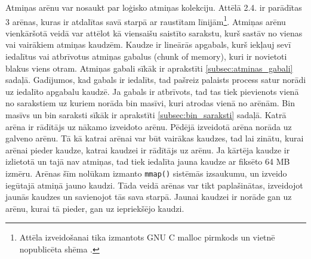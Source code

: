 Atmiņas arēnu var nosaukt par loģisko atmiņas kolekciju. Attēlā 2.4. ir parādītas 3 arēnas, kuras ir atdalītas savā starpā ar raustītam līnijām\footnote{Attēla izveidošanai tika izmantots GNU C malloc pirmkods \cite {MALLOC} un vietnē nopublicēta shēma \cite{AMM}.}.
 Atmiņas arēnu  vienkāršotā veidā var attēlot kā viensaišu saistīto sarakstu, kurš sastāv no vienas vai vairākiem atmiņas kaudzēm. 
 Kaudze ir lineārās apgabals, kurš iekļauj sevī iedalītus vai atbrīvotus atmiņas gabalus (chunk of memory), kuri ir novietoti blakus viens otram.
 Atmiņas gabali sīkāk ir aprakstīti \ref{subsec:atminas_gabali} sadaļā.
 Gadījumos, kad gabals ir iedalīts, tad pašreiz palaists process satur norādi uz iedalīto apgabalu kaudzē. 
 Ja gabals ir atbrīvots, tad tas tiek pievienots vienā no sarakstiem uz kuriem norāda bin masīvi, kuri atrodas vienā no arēnām.
Bin masīvs un bin saraksti sīkāk ir aprakstīti \ref{subsec:bin_saraksti} sadaļā. 
 Katrā arēna ir rādītājs uz nākamo izveidoto arēnu. Pēdējā izveidotā arēna norāda uz galveno arēnu.
 Tā kā katrai arēnai var būt vairākas kaudzes, tad lai zinātu, kurai arēnai pieder kaudze, katrai kaudzei ir rādītājs uz arēnu.
 Ja kārtēja kaudze ir izlietotā un tajā nav atmiņas, tad tiek iedalīta jauna kaudze ar fiksēto 64 MB izmēru.
 Arēnas šīm nolūkam izmanto \texttt{mmap()} sistēmās izsaukumu, un izveido iegūtajā atmiņā jauno kaudzi. 
  Tāda veidā arēnas var tikt paplašinātas, izveidojot jaunās kaudzes un savienojot tās sava starpā.
 Jaunai kaudzei ir norāde gan uz arēnu, kurai tā pieder, gan uz iepriekšējo kaudzi.

